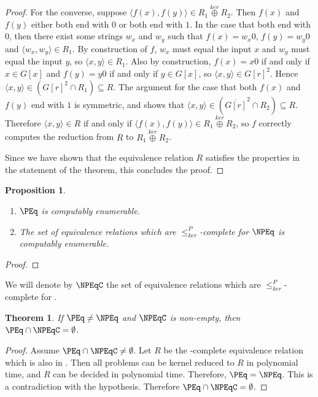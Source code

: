 \documentclass{article}
\newtheorem{theorem}{Theorem}[section]
\newtheorem{proposition}[proposition]{Proposition}
\theoremstyle{definition} \newtheorem{definition}[definition]{Definition}
\newcommand{\kj}{\overset{ker}{\oplus}} %
\newcommand{\kr}{\leq^{P}_{ker}} %
\newcommand{\pair}[2]{\langle#1,#2\rangle} %
\begin{document}
\begin{proof}
  For the converse, suppose $\pair{f(x)}{f(y)}\in R_1\kj R_2$. Then $f(x)$ and
  $f(y)$ either both end with $0$ or both end with $1$. In the case that both
  end with $0$, then there exist some strings $w_x$ and $w_y$ such that
  $f(x)=w_x0$, $f(y)=w_y0$ and $\pair{w_x}{w_y}\in R_1$. By construction of
  $f$, $w_x$ must equal the input $x$ and $w_y$ must equal the input $y$, so
  $\pair{x}{y}\in R_1$. Also by construction, $f(x)=x0$ if and only if $x\in
  G[x]$ and $f(y)=y0$ if and only if $y\in G[x]$, so
  $\pair{x}{y}\in{G[r]}^2$. Hence $\pair{x}{y}\in({G[r]}^2\cap R_1)\subseteq
  R$. The argument for the case that both $f(x)$ and $f(y)$ end with $1$ is
  symmetric, and shows that $\pair{x}{y}\in(\overline{G[r]}^2\cap R_2)\subseteq
  R$. Therefore $\pair{x}{y}\in R$ if and only if $\pair{f(x)}{f(y)}\in R_1\kj
  R_2$, so $f$ correctly computes the reduction from $R$ to $R_1\kj R_2$.

  Since we have shown that the equivalence relation $R$ satisfies the
  properties in the statement of the theorem, this concludes the proof.
\end{proof}

\begin{proposition}
  \mbox{} %
  \begin{enumerate}
  \item $\PEq$ is computably enumerable.
  \item The set of equivalence relations which are $\kr$-complete for $\NPEq$
    is computably enumerable.
  \end{enumerate}
\end{proposition}
\begin{proof}
\end{proof}

We will denote by $\NPEqC$ the set of equivalence relations which are
$\kr$-complete for \NPEq.

\begin{theorem}\label{thm:npeqc}
  If $\PEq\neq\NPEq$ and $\NPEqC$ is non-empty, then
  $\PEq\cap\NPEqC=\emptyset$.
\end{theorem}
\begin{proof}
  Assume $\PEq\cap\NPEqC\neq\emptyset$. Let $R$ be the \NPEq-complete
  equivalence relation which is also in \PEq. Then all problems can be kernel
  reduced to $R$ in polynomial time, and $R$ can be decided in polynomial
  time. Therefore, $\PEq=\NPEq$. This is a contradiction with the
  hypothesis. Therefore $\PEq\cap\NPEqC=\emptyset$.
\end{proof}
\end{document}
